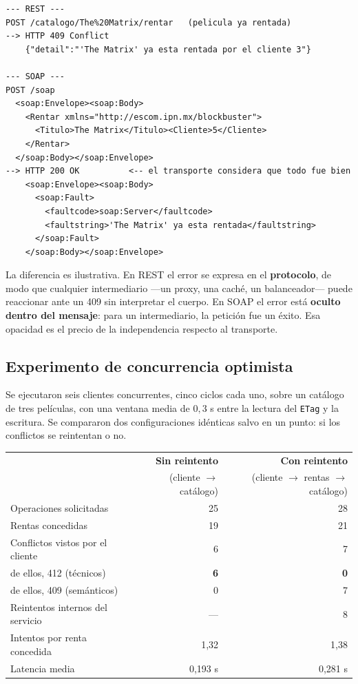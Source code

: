 \documentclass[12pt]{article}
\begin{document}
\begin{lstlisting}[style=traza,caption={La misma operación fallida en los dos estilos}]
--- REST ---
POST /catalogo/The%20Matrix/rentar   (pelicula ya rentada)
--> HTTP 409 Conflict
    {"detail":"'The Matrix' ya esta rentada por el cliente 3"}

--- SOAP ---
POST /soap
  <soap:Envelope><soap:Body>
    <Rentar xmlns="http://escom.ipn.mx/blockbuster">
      <Titulo>The Matrix</Titulo><Cliente>5</Cliente>
    </Rentar>
  </soap:Body></soap:Envelope>
--> HTTP 200 OK          <-- el transporte considera que todo fue bien
    <soap:Envelope><soap:Body>
      <soap:Fault>
        <faultcode>soap:Server</faultcode>
        <faultstring>'The Matrix' ya esta rentada</faultstring>
      </soap:Fault>
    </soap:Body></soap:Envelope>
\end{lstlisting}

La diferencia es ilustrativa. En REST el error se expresa en el \textbf{protocolo}, de modo que cualquier intermediario —un proxy, una caché, un balanceador— puede reaccionar ante un 409 sin interpretar el cuerpo. En SOAP el error está \textbf{oculto dentro del mensaje}: para un intermediario, la petición fue un éxito. Esa opacidad es el precio de la independencia respecto al transporte.

\subsection{Experimento de concurrencia optimista}

Se ejecutaron seis clientes concurrentes, cinco ciclos cada uno, sobre un catálogo de tres películas, con una ventana media de $0{,}3$ s entre la lectura del \texttt{ETag} y la escritura. Se compararon dos configuraciones idénticas salvo en un punto: si los conflictos se reintentan o no.

\begin{center}
\begin{tabular}{lrr}
\toprule
 & \textbf{Sin reintento} & \textbf{Con reintento} \\
 & \small(cliente $\to$ catálogo) & \small(cliente $\to$ rentas $\to$ catálogo) \\
\midrule
Operaciones solicitadas       & 25     & 28 \\
Rentas concedidas             & 19     & 21 \\
Conflictos vistos por el cliente & 6   & 7 \\
\quad de ellos, 412 (técnicos)   & \textbf{6}   & \textbf{0} \\
\quad de ellos, 409 (semánticos) & 0   & 7 \\
Reintentos internos del servicio & ---  & 8 \\
Intentos por renta concedida  & 1,32   & 1,38 \\
Latencia media                & 0,193 s & 0,281 s \\
\bottomrule
\end{tabular}
\end{center}
\end{document}
